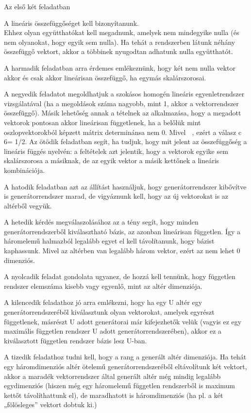 \begin{frame}
  \begin{tcolorbox}[title={3/11. -Q-}]
Az első két feladatban 

A lineáris összefüggőséget kell bizonyítanunk.\\
Ehhez olyan együtthatókat kell megadnunk, amelyek nem mindegyike nulla (és nem olyanokat, hogy egyik sem nulla). Ha tehát a rendszerben látunk néhány összefüggő vektort, akkor a többinek nyugodtan adhatunk nulla együtthatót.

A harmadik feladatban arra érdemes emlékeznünk, hogy két nem nulla vektor akkor és csak akkor lineárisan összefüggő, ha egymás skalárszorosai.

A negyedik feladatot megoldhatjuk a szokásos homogén lineáris egyenletrendszer vizsgálatával (ha a megoldások száma nagyobb, mint 1, akkor a vektorrendszer összefüggő). Másik lehetőség annak a tételnek az alkalmazása, hogy a megadott vektorok pontosan akkor lineárisan függetlenek, ha a belőlük mint oszlopvektorokból képzett mátrix determinánsa nem 0. Mivel

, ezért a válasz c 6= 1/2. Az ötödik feladatban segít, ha tudjuk, hogy mit jelent az összefüggőség a lineáris függés nyelvén: a feltételek azt jelentik, hogy a vektorok egyike sem skalárszorosa a másiknak, de az egyik vektor a másik kettőnek a lineáris kombinációja. 

A hatodik feladatban azt az állítást használjuk, hogy generátorrendszer kibővítve is generátorrendszer marad, de vigyáznunk kell, hogy az új vektorokat is az altérből vegyük. 

A hetedik kérdés megválaszolásához az a tény segít, hogy minden generátorrendszerből kiválasztható bázis, az azonban lineárisan független. Így a háromelemű halmazból legalább egyet el kell távolítanunk, hogy bázist kaphassunk. Mivel az altérben van legalább három vektor, ezért az nem lehet 0 dimenziós. 

A nyolcadik feladat gondolata ugyanez, de hozzá kell tennünk, hogy független rendszer elemszáma kisebb vagy egyenlő, mint az altér dimenziója. 

A kilencedik feladathoz jó arra emlékezni, hogy ha egy U altér egy generátorrendszeréből kiválasztunk olyan vektorokat, amelyek egyrészt függetlenek, másrészt U adott generátorai már kifejezhetők velük (vagyis ez egy maximális független rendszer U adott generátorrendszerében), akkor ez a kiválasztott független rendszer bázis lesz U-ban.

A tizedik feladathoz tudni kell, hogy a rang a generált altér dimenziója. Ha tehát egy háromdimenziós altér ötelemű generátorrendszeréből eltávolítunk két vektort, akkor a maradék vektorrendszer által generált altér még mindig legalább egydimenziós (hiszen még egy háromelemű független rendszerből is maximum kettőt távolíthattunk el), de maradhatott is háromdimenziós (ha pl. a két „fölösleges” vektort dobtuk ki.) 


\end{tcolorbox}
\end{frame}
